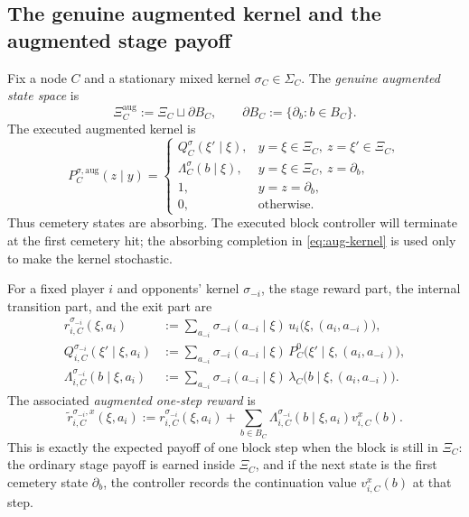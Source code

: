 \documentclass[12pt]{article}
\theoremstyle{definition}
\newcommand{\1}{\mathbf{1}}
\begin{document}
\subsection{The genuine augmented kernel and the augmented stage payoff}

Fix a node $C$ and a stationary mixed kernel $\sigma_C\in\Sigma_C$. The
\emph{genuine augmented state space} is
\[
\Xi_C^{\mathrm{aug}}:=\Xi_C\sqcup \partial B_C,
\qquad
\partial B_C:=\{\partial_b:b\in B_C\}.
\]
The executed augmented kernel is
\begin{equation}
\label{eq:aug-kernel}
P_C^{\sigma,\mathrm{aug}}(z\mid y)
=
\begin{cases}
Q_C^{\sigma}(\xi'\mid \xi), & y=\xi\in\Xi_C,\ z=\xi'\in\Xi_C,\\[0.3em]
\Lambda_C^{\sigma}(b\mid \xi), & y=\xi\in\Xi_C,\ z=\partial_b,\\[0.3em]
1, & y=z=\partial_b,\\[0.3em]
0, & \text{otherwise.}
\end{cases}
\end{equation}
Thus cemetery states are absorbing. The executed block controller will terminate at
the first cemetery hit; the absorbing completion in \eqref{eq:aug-kernel} is used
only to make the kernel stochastic.

For a fixed player $i$ and opponents' kernel $\sigma_{-i}$, the stage reward part,
the internal transition part, and the exit part are
\begin{align}
\label{eq:r-sigma}
r_{i,C}^{\sigma_{-i}}(\xi,a_i)
&:=
\sum_{a_{-i}}\sigma_{-i}(a_{-i}\mid\xi)
\,u_i\bigl(\xi,(a_i,a_{-i})\bigr),
\\
\label{eq:Q-sigma}
Q_{i,C}^{\sigma_{-i}}(\xi'\mid \xi,a_i)
&:=
\sum_{a_{-i}}\sigma_{-i}(a_{-i}\mid\xi)
\,P_C^0\bigl(\xi'\mid\xi,(a_i,a_{-i})\bigr),
\\
\label{eq:q-exit-sigma}
\Lambda_{i,C}^{\sigma_{-i}}(b\mid\xi,a_i)
&:=
\sum_{a_{-i}}\sigma_{-i}(a_{-i}\mid\xi)
\,\lambda_C\bigl(b\mid\xi,(a_i,a_{-i})\bigr).
\end{align}
The associated \emph{augmented one-step reward} is
\begin{equation}
\label{eq:augmented-reward}
\widetilde r_{i,C}^{\sigma_{-i},x}(\xi,a_i)
:=
r_{i,C}^{\sigma_{-i}}(\xi,a_i)
+
\sum_{b\in B_C}\Lambda_{i,C}^{\sigma_{-i}}(b\mid\xi,a_i)v_{i,C}^x(b).
\end{equation}
This is exactly the expected payoff of one block step when the block is still in
$\Xi_C$: the ordinary stage payoff is earned inside $\Xi_C$, and if the next state
is the first cemetery state $\partial_b$, the controller records the continuation
value $v_{i,C}^x(b)$ at that step.
\end{document}
